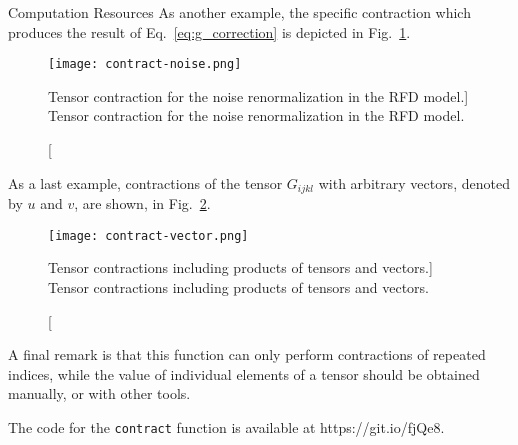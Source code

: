 \begin{chapter}{Computation Resources}
As another example, the specific contraction which produces the result of Eq.~\eqref{eq:g_correction} is depicted in Fig.~\ref{fig:contract-noise}.

\begin{figure}[h]
	\centering
	\texttt{[image: contract-noise.png]}
	\caption
	[Tensor contraction for the noise renormalization in the RFD model.]
	{Tensor contraction for the noise renormalization in the RFD model.}
	\label{fig:contract-noise}
\end{figure}

As a last example, contractions of the tensor $G_{ijkl}$ with arbitrary vectors, denoted by $u$ and $v$, are shown, in Fig.~\ref{fig:contract-vector}.

\begin{figure}[ht]
	\centering
	\texttt{[image: contract-vector.png]}
	\caption
	[Tensor contractions including products of tensors and vectors.]
	{Tensor contractions including products of tensors and vectors.}
	\label{fig:contract-vector}
\end{figure}

A final remark is that this function can only perform contractions of repeated indices, while the value of individual elements of a tensor should be obtained manually, or with other tools.

The code for the \texttt{contract} function is available at https://git.io/fjQe8.

\end{chapter}
